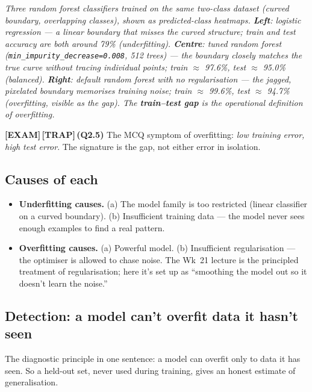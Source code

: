 \documentclass[11pt, a4paper]{article}
\newcommand{\examflag}{\textcolor{tipBd}{\textbf{[EXAM]}}\,}
\newcommand{\trapflag}{\textcolor{trapBd}{\textbf{[TRAP]}}\,}
\begin{document}
\begin{center}

\footnotesize\textit{Three random forest classifiers trained on the same two-class dataset (curved boundary, overlapping classes), shown as predicted-class heatmaps. \textbf{Left}: logistic regression --- a linear boundary that misses the curved structure; train and test accuracy are both around 79\% (underfitting). \textbf{Centre}: tuned random forest (\texttt{min\_impurity\_decrease=0.008}, 512 trees) --- the boundary closely matches the true curve without tracing individual points; train $\approx$ 97.6\%, test $\approx$ 95.0\% (balanced). \textbf{Right}: default random forest with no regularisation --- the jagged, pixelated boundary memorises training noise; train $\approx$ 99.6\%, test $\approx$ 94.7\% (overfitting, visible as the gap). The \textbf{train--test gap} is the operational definition of overfitting.}
\end{center}

\examflag{}\trapflag{}\textbf{(Q2.5)} The MCQ symptom of overfitting: \emph{low training error, high test error}. The signature is the gap, not either error in isolation.

\subsection{Causes of each}

\begin{itemize}
  \item \textbf{Underfitting causes.} (a) The model family is too restricted (linear classifier on a curved boundary). (b) Insufficient training data — the model never sees enough examples to find a real pattern.
  \item \textbf{Overfitting causes.} (a) Powerful model. (b) Insufficient regularisation — the optimiser is allowed to chase noise. The Wk~21 lecture is the principled treatment of regularisation; here it's set up as ``smoothing the model out so it doesn't learn the noise.''
\end{itemize}

\subsection{Detection: a model can't overfit data it hasn't seen}

The diagnostic principle in one sentence: a model can overfit only to data it has seen. So a held-out set, never used during training, gives an honest estimate of generalisation.
\end{document}

